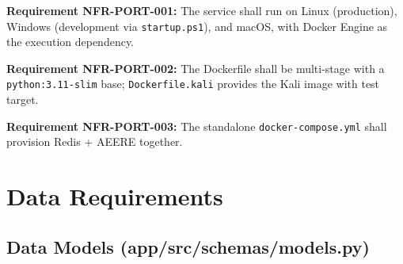 \documentclass[10pt,journal,onecolumn]{IEEEtran}
\newcommand{\reqid}[1]{\textbf{#1}}
\begin{document}
\reqid{Requirement NFR-PORT-001:} The service shall run on Linux (production), Windows (development via \texttt{startup.ps1}), and macOS, with Docker Engine as the execution dependency.

\reqid{Requirement NFR-PORT-002:} The Dockerfile shall be multi-stage with a \texttt{python:3.11-slim} base; \texttt{Dockerfile.kali} provides the Kali image with test target.

\reqid{Requirement NFR-PORT-003:} The standalone \texttt{docker-compose.yml} shall provision Redis + AEERE together.

\section{Data Requirements}

\subsection{Data Models (app/src/schemas/models.py)}
\end{document}
